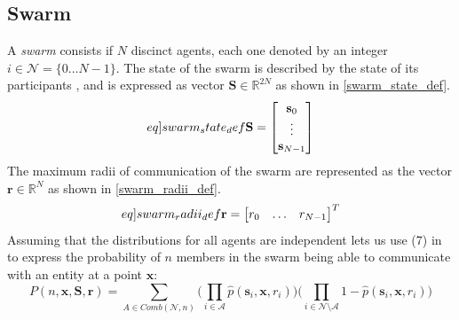\subsection{Swarm}
A \textit{swarm} consists if $N$ discinct agents, each one denoted by an integer $i\in\mathcal{N}=\{0\hdots N-1\}$. The state of the swarm is described by the state of its participants 
, and is expressed as vector $\mathbf{S}\in\mathbb{R}^{2N}$ as shown in \eqref{swarm_state_def}.
\begin{equation}\label[eq]{swarm_state_def}
  \mathbf{S} = \begin{bmatrix}
    \mathbf{s}_{0}\\\vdots\\\mathbf{s}_{N-1}
  \end{bmatrix}
\end{equation}
The maximum radii of communication of the swarm are represented as the vector $\mathbf{r}\in\mathbb{R}^{N}$ as shown in \eqref{swarm_radii_def}.
\begin{equation}\label[eq]{swarm_radii_def}
  \mathbf{r} = \begin{bmatrix}
    r_{0}&\hdots&r_{N-1}
  \end{bmatrix}^{T}
\end{equation}
Assuming that the distributions for all agents are independent lets us use (7) in \cite{10.2307/24304959} to express 
the probability of $n$ members in the swarm being able to communicate with an entity at a point $\mathbf{x}$:
\begin{equation}
  P(n, \mathbf{x}, \mathbf{S}, \mathbf{r}) = \sum_{A\in Comb(\mathcal{N}, n)}\Bigg(\prod_{i\in\mathcal{A}}\hat{p}(\mathbf{s}_{i}, \mathbf{x}, r_{i})\Bigg)\Bigg(\prod_{i\in\mathcal{N}\setminus\mathcal{A}}1-\hat{p}(\mathbf{s}_{i}, \mathbf{x}, r_{i})\Bigg)
\end{equation}